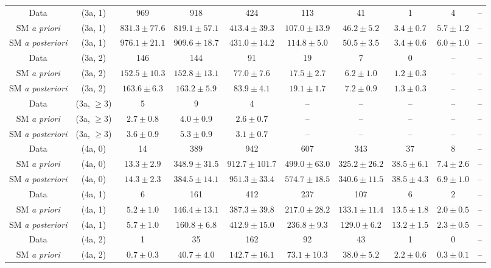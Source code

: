 \begin{table}[h!]
{\begin{tabular}{cccccccccc}
	Data & (3a, 1) & 969 & 918 & 424 & 113 & 41 & 1 & 4 & -- \\[0.5ex] 
	SM \textit{a priori} & (3a, 1) & $831.3\pm 77.6$ & $819.1\pm 57.1$ & $413.4\pm 39.3$ & $107.0\pm 13.9$ & $46.2\pm 5.2$ & $3.4\pm 0.7$ & $5.7\pm 1.2$ & -- \\[0.5ex] 
	SM \textit{a posteriori} & (3a, 1) & $976.1\pm 21.1$ & $909.6\pm 18.7$ & $431.0\pm 14.2$ & $114.8\pm 5.0$ & $50.5\pm 3.5$ & $3.4\pm 0.6$ & $6.0\pm 1.0$ & -- \\[0.5ex] 
	Data & (3a, 2) & 146 & 144 & 91 & 19 & 7 & 0 & -- & -- \\[0.5ex] 
	SM \textit{a priori} & (3a, 2) & $152.5\pm 10.3$ & $152.8\pm 13.1$ & $77.0\pm 7.6$ & $17.5\pm 2.7$ & $6.2\pm 1.0$ & $1.2\pm 0.3$ & -- & -- \\[0.5ex] 
	SM \textit{a posteriori} & (3a, 2) & $163.6\pm 6.3$ & $163.2\pm 5.9$ & $83.9\pm 4.1$ & $19.1\pm 1.7$ & $7.2\pm 0.9$ & $1.3\pm 0.3$ & -- & -- \\[0.5ex] 
	Data & (3a, $\ge3$) & 5 & 9 & 4 & -- & -- & -- & -- & -- \\[0.5ex] 
	SM \textit{a priori} & (3a, $\ge3$) & $2.7\pm 0.8$ & $4.0\pm 0.9$ & $2.6\pm 0.7$ & -- & -- & -- & -- & -- \\[0.5ex] 
	SM \textit{a posteriori} & (3a, $\ge3$) & $3.6\pm 0.9$ & $5.3\pm 0.9$ & $3.1\pm 0.7$ & -- & -- & -- & -- & -- \\[0.5ex] 
	Data & (4a, 0) & 14 & 389 & 942 & 607 & 343 & 37 & 8 & -- \\[0.5ex] 
	SM \textit{a priori} & (4a, 0) & $13.3\pm 2.9$ & $348.9\pm 31.5$ & $912.7\pm 101.7$ & $499.0\pm 63.0$ & $325.2\pm 26.2$ & $38.5\pm 6.1$ & $7.4\pm 2.6$ & -- \\[0.5ex] 
	SM \textit{a posteriori} & (4a, 0) & $14.3\pm 2.3$ & $384.5\pm 14.1$ & $951.3\pm 33.4$ & $574.7\pm 18.5$ & $340.6\pm 11.5$ & $38.5\pm 4.3$ & $6.9\pm 1.0$ & -- \\[0.5ex] 
	Data & (4a, 1) & 6 & 161 & 412 & 237 & 107 & 6 & 2 & -- \\[0.5ex] 
	SM \textit{a priori} & (4a, 1) & $5.2\pm 1.0$ & $146.4\pm 13.1$ & $387.3\pm 39.8$ & $217.0\pm 28.2$ & $133.1\pm 11.4$ & $13.5\pm 1.8$ & $2.0\pm 0.5$ & -- \\[0.5ex] 
	SM \textit{a posteriori} & (4a, 1) & $5.7\pm 1.0$ & $160.8\pm 6.8$ & $412.9\pm 15.0$ & $236.8\pm 9.3$ & $129.0\pm 6.2$ & $13.2\pm 1.5$ & $2.3\pm 0.5$ & -- \\[0.5ex] 
	Data & (4a, 2) & 1 & 35 & 162 & 92 & 43 & 1 & 0 & -- \\[0.5ex] 
	SM \textit{a priori} & (4a, 2) & $0.7\pm 0.3$ & $40.7\pm 4.0$ & $142.7\pm 16.1$ & $73.1\pm 10.3$ & $38.0\pm 5.2$ & $2.2\pm 0.6$ & $0.3\pm 0.1$ & -- \\[0.5ex] 

\end{tabular}}
\end{table}
